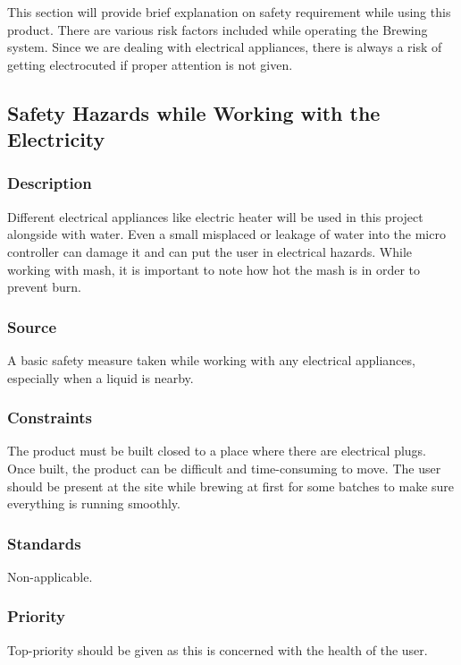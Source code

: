 This section will provide brief explanation on safety requirement while using this product. There are various risk factors included while operating the Brewing system. Since we are dealing with electrical appliances, there is always a risk of getting electrocuted if proper attention is not given. 

\subsection{Safety Hazards while Working with the Electricity}
\subsubsection{Description}
Different electrical appliances like electric heater will be used in this project alongside with water. Even a small misplaced or leakage of water into the micro controller can damage it and can put the user in electrical hazards. While working with mash, it is important to note how hot the mash is in order to prevent burn.

\subsubsection{Source}
A basic safety measure taken while working with any electrical appliances, especially when a liquid is nearby.

\subsubsection{Constraints}
The product must be built closed to a place where there are electrical plugs. Once built, the product can be difficult and time-consuming to move. The user should be present at the site while brewing at first for some batches to make sure everything is running smoothly.

\subsubsection{Standards}
Non-applicable.

\subsubsection{Priority}
Top-priority should be given as this is concerned with the health of the user.